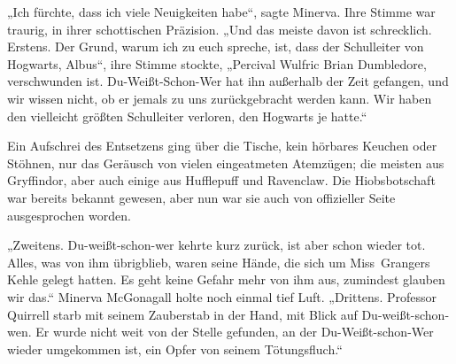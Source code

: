 „Ich fürchte, dass ich viele Neuigkeiten habe“, sagte Minerva.
Ihre Stimme war traurig, in ihrer schottischen Präzision.
„Und das meiste davon ist schrecklich. Erstens. Der Grund, warum ich zu euch spreche, ist, dass der Schulleiter von Hogwarts, Albus“, ihre Stimme stockte,
„Percival Wulfric Brian Dumbledore, verschwunden ist. Du-Weißt-Schon-Wer hat ihn außerhalb der Zeit gefangen, und wir wissen nicht, ob er jemals zu uns zurückgebracht werden kann. Wir haben den vielleicht größten Schulleiter verloren, den Hogwarts je hatte.“

Ein Aufschrei des Entsetzens ging über die Tische, kein hörbares Keuchen oder Stöhnen, nur das Geräusch von vielen eingeatmeten Atemzügen; die meisten aus Gryffindor, aber auch einige aus Hufflepuff und Ravenclaw. Die Hiobsbotschaft war bereits bekannt gewesen, aber nun war sie auch von offizieller Seite ausgesprochen worden.

„Zweitens. Du-weißt-schon-wer kehrte kurz zurück, ist aber schon wieder tot. Alles, was von ihm übrigblieb, waren seine Hände, die sich um Miss~Grangers Kehle gelegt hatten. Es geht keine Gefahr mehr von ihm aus, zumindest glauben wir das.“
Minerva McGonagall holte noch einmal tief Luft.
„Drittens. Professor Quirrell starb mit seinem Zauberstab in der Hand, mit Blick auf Du-weißt-schon-wen. Er wurde nicht weit von der Stelle gefunden, an der Du-Weißt-schon-Wer wieder umgekommen ist, ein Opfer von seinem Tötungsfluch.“

